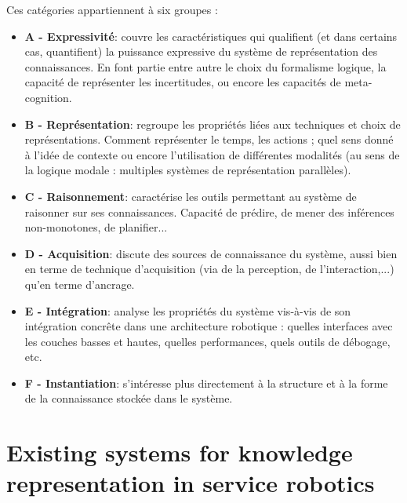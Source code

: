 Ces catégories appartiennent à six groupes :

\begin{itemize}
    
    \item \textbf{A - Expressivité}: couvre les caractéristiques qui qualifient
        (et dans certains cas, quantifient) la puissance expressive du système
        de représentation des connaissances. En font partie entre autre le
        choix du formalisme logique, la capacité de représenter les
        incertitudes, ou encore les capacités de meta-cognition.

    \item \textbf{B - Représentation}: regroupe les propriétés liées aux
        techniques et choix de représentations. Comment représenter le temps,
        les actions ; quel sens donné à l'idée de contexte ou encore
        l'utilisation de différentes modalités (au sens de la logique modale :
        multiples systèmes de représentation parallèles).

    \item \textbf{C - Raisonnement}: caractérise les outils permettant au
        système de raisonner sur ses connaissances. Capacité de prédire, de
        mener des inférences non-monotones, de planifier...
    
    \item \textbf{D - Acquisition}: discute des sources de connaissance du
        système, aussi bien en terme de technique d'acquisition (via de la
        perception, de l'interaction,...) qu'en terme d'ancrage.
    
    \item \textbf{E - Intégration}: analyse les propriétés du système vis-à-vis
        de son intégration concrête dans une architecture robotique : quelles
        interfaces avec les couches basses et hautes, quelles performances,
        quels outils de débogage, etc.
    
    \item \textbf{F - Instantiation}: s'intéresse plus directement à la
        structure et à la forme de la connaissance stockée dans le système.

\end{itemize}

\section{Existing systems for knowledge representation in service robotics}
\label{sect|surveyed-systems}


